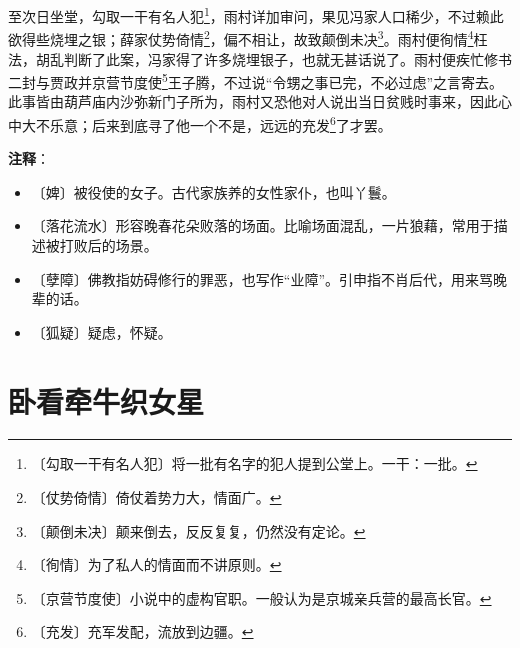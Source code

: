 \documentclass[12pt,UTF-8,openany]{ctexbook}
\begin{document}
\begin{large}
    至次日坐堂，勾取一干有名人犯\footnote{〔勾取一干有名人犯〕将一批有名字的犯人提到公堂上。一干：一批。}，雨村详加审问，果见冯家人口稀少，不过赖此欲得些烧埋之银；薛家仗势倚情\footnote{〔仗势倚情〕倚仗着势力大，情面广。}，偏不相让，故致颠倒未决\footnote{〔颠倒未决〕颠来倒去，反反复复，仍然没有定论。}。雨村便徇情\footnote{〔徇情〕为了私人的情面而不讲原则。}枉法，胡乱判断了此案，冯家得了许多烧埋银子，也就无甚话说了。雨村便疾忙修书二封与贾政并京营节度使\footnote{〔京营节度使〕小说中的虚构官职。一般认为是京城亲兵营的最高长官。}王子腾，不过说“令甥之事已完，不必过虑”之言寄去。此事皆由葫芦庙内沙弥新门子所为，雨村又恐他对人说出当日贫贱时事来，因此心中大不乐意；后来到底寻了他一个不是，远远的充发\footnote{〔充发〕充军发配，流放到边疆。}了才罢。
    
\end{large}


\newpage

\textbf{注释}：

\vspace{-1em}

\begin{itemize}
    \setlength\itemsep{-0.2em}
    \item 〔婢〕被役使的女子。古代家族养的女性家仆，也叫丫鬟。
    \item 〔落花流水〕形容晚春花朵败落的场面。比喻场面混乱，一片狼藉，常用于描述被打败后的场景。
    \item 〔孽障〕佛教指妨碍修行的罪恶，也写作“业障”。引申指不肖后代，用来骂晚辈的话。
    \item 〔狐疑〕疑虑，怀疑。
\end{itemize}

\chapter{卧看牵牛织女星}
\end{document}
